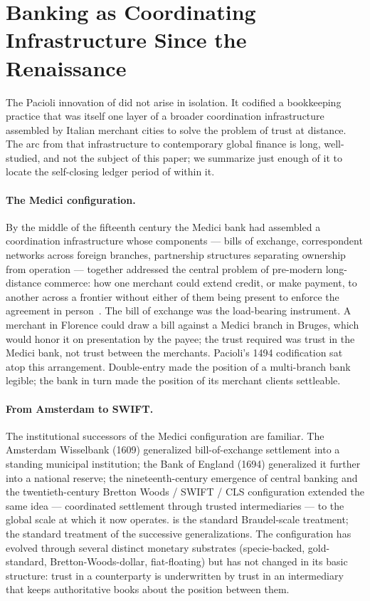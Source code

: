 \documentclass[11pt,a4paper]{article}
\theoremstyle{definition}
\theoremstyle{remark}
\begin{document}
\section{Banking as Coordinating Infrastructure Since the Renaissance}
\label{sec:banking-arc}

The Pacioli innovation of  did not arise
in isolation. It codified a bookkeeping practice that was itself
one layer of a broader coordination infrastructure assembled by
Italian merchant cities to solve the problem of trust at distance.
The arc from that infrastructure to contemporary global finance is
long, well-studied, and not the subject of this paper; we
summarize just enough of it to locate the self-closing ledger
period of  within it.

\paragraph{The Medici configuration.}
By the middle of the fifteenth century the Medici bank had
assembled a coordination infrastructure whose components --- bills
of exchange, correspondent networks across foreign branches,
partnership structures separating ownership from operation ---
together addressed the central problem of pre-modern long-distance
commerce: how one merchant could extend credit, or make payment,
to another across a frontier without either of them being present
to enforce the agreement in person~\citep{deroover1963medici}. The
bill of exchange was the load-bearing instrument. A merchant in
Florence could draw a bill against a Medici branch in Bruges,
which would honor it on presentation by the payee; the trust
required was trust in the Medici bank, not trust between the
merchants. Pacioli's 1494 codification sat atop this arrangement.
Double-entry made the position of a multi-branch bank legible; the
bank in turn made the position of its merchant clients settleable.

\paragraph{From Amsterdam to SWIFT.}
The institutional successors of the Medici configuration are
familiar. The Amsterdam Wisselbank (1609) generalized
bill-of-exchange settlement into a standing municipal institution;
the Bank of England (1694) generalized it further into a national
reserve; the nineteenth-century emergence of central banking and
the twentieth-century Bretton Woods / SWIFT / CLS configuration
extended the same idea --- coordinated settlement through trusted
intermediaries --- to the global scale at which it now operates.
\citet{braudel1982wheels} is the standard Braudel-scale treatment;
\citet{kindleberger1993financial} the standard treatment of the
successive generalizations. The configuration has evolved through
several distinct monetary substrates (specie-backed, gold-standard,
Bretton-Woods-dollar, fiat-floating) but has not changed in its
basic structure: trust in a counterparty is underwritten by trust
in an intermediary that keeps authoritative books about the
position between them.
\end{document}
